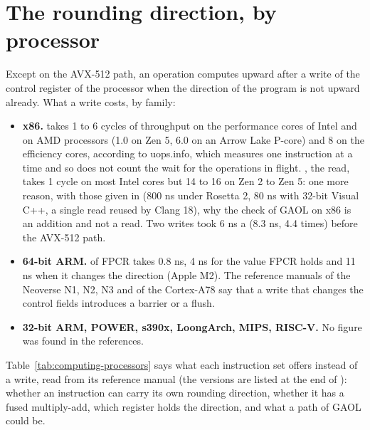 \documentclass[12pt,a4paper,twoside,openright]{book}
\begin{document}
\section{The rounding direction, by processor}
\label{sec:rounding-by-processor}
%

Except on the AVX-512 path, an operation computes upward after a write of
the control register of the processor when the direction of the program is
not upward already. What a write costs, by family:

\begin{itemize}
\item[$\bullet$] \textbf{x86.}  takes 1 to 6 cycles of
throughput on the performance cores of Intel and on AMD processors (1.0 on
Zen 5, 6.0 on an Arrow Lake P-core) and 8 on the efficiency cores, according
to uops.info, which measures one instruction at a time and so does not count
the wait for the operations in flight. , the read, takes 1
cycle on most Intel cores but 14 to 16 on Zen 2 to Zen 5: one more reason,
with those given in  (800 ns under Rosetta 2, 80 ns
with 32-bit Visual C++, a single read reused by Clang 18), why the check of
GAOL on x86 is an addition and not a read. Two writes took 6 ns a
 (8.3 ns, 4.4 times) before the AVX-512 path.
\item[$\bullet$] \textbf{64-bit ARM.}  of FPCR takes 0.8 ns,
 4 ns for the value FPCR holds and 11 ns when it changes the
direction (Apple M2). The reference manuals of the Neoverse N1, N2, N3 and
of the Cortex-A78 say that a write that changes the control fields
introduces a barrier or a flush.
\item[$\bullet$] \textbf{32-bit ARM, POWER, s390x, LoongArch, MIPS, RISC-V.}
No figure was found in the references.
\end{itemize}

\medskip
\noindent Table~\ref{tab:computing-processors} says what each instruction
set offers instead of a write, read from its reference manual (the versions
are listed at the end of ): whether an instruction can
carry its own rounding direction, whether it has a fused multiply-add, which
register holds the direction, and what a path of GAOL could be.
\end{document}
